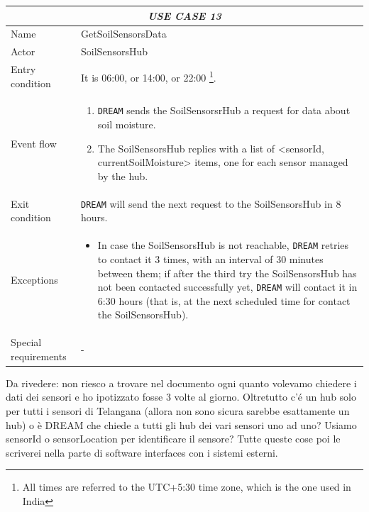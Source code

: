 \documentclass{article}
\begin{document}

\centering
\begin{longtable}{|p{3.5cm}|m{8cm}|}
 \hline
 \multicolumn{2}{|c|}{\cellcolor{white}\emph{USE CASE 13}} \\
 \endfirsthead
 \endhead
 \endfoot
 \endlastfoot
 \hline
 Name & GetSoilSensorsData\\
 \hline
 Actor & SoilSensorsHub\\
 \hline
 Entry condition & It is 06:00, or 14:00, or 22:00 \footnote{All times are referred to the UTC+5:30 time zone, which is the one used in India}.\\
 \hline 
 Event flow & \begin{enumerate}
    \item \verb|DREAM| sends the SoilSensorsrHub a request for data about soil moisture.
    \item The SoilSensorsHub replies with a list of <sensorId, currentSoilMoisture> items, one for each sensor managed by the hub.
 \end{enumerate}\\
 \hline
 Exit condition & \verb|DREAM| will send the next request to the SoilSensorsHub in 8 hours.\\
 \hline
 Exceptions & \begin{itemize}
     \item In case the SoilSensorsHub is not reachable, \verb|DREAM| retries to contact it 3 times, with an interval of 30 minutes between them; if after the third try the SoilSensorsHub has not been contacted successfully yet, \verb|DREAM| will contact it in 6:30 hours (that is, at the next scheduled time for contact the SoilSensorsHub).
 \end{itemize}\\
 \hline
 Special requirements & -\\
 \hline
\end{longtable}

\color{red}
Da rivedere: non riesco a trovare nel documento ogni quanto volevamo chiedere i dati dei sensori e ho ipotizzato fosse 3 volte al giorno. Oltretutto c'é un hub solo per tutti i sensori di Telangana (allora non sono sicura sarebbe esattamente un hub) o è DREAM che chiede a tutti gli hub dei vari sensori uno ad uno?
Usiamo sensorId o sensorLocation per identificare il sensore? Tutte queste cose poi le scriverei nella parte di software interfaces con i sistemi esterni.
\color{black}
\end{document}
